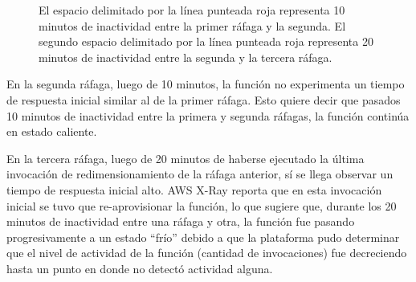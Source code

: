 \begin{figure}
\hspace{-1.0cm}
\caption{El espacio delimitado por la línea punteada roja representa 10 minutos de inactividad entre la primer ráfaga y la segunda. El segundo espacio delimitado por la línea punteada roja representa 20 minutos de inactividad entre la segunda y la tercera ráfaga.}
\label{fig:rafagas-hasta-500kb}
\end{figure}

En la segunda ráfaga, luego de 10 minutos, la función no experimenta un tiempo de respuesta inicial similar al de la primer ráfaga. Esto quiere decir que pasados 10 minutos de inactividad entre la primera y segunda ráfagas, la función continúa en estado caliente.

En la tercera ráfaga, luego de 20 minutos de haberse ejecutado la última invocación de redimensionamiento de la ráfaga anterior, sí se llega observar un tiempo de respuesta inicial alto. AWS X-Ray reporta que en esta invocación inicial se tuvo que re-aprovisionar la función, lo que sugiere que, durante los 20 minutos de inactividad entre una ráfaga y otra, la función fue pasando progresivamente a un estado ``frío'' debido a que la plataforma pudo determinar que el nivel de actividad de la función (cantidad de invocaciones) fue decreciendo hasta un punto en donde no detectó actividad alguna.

